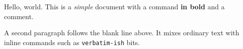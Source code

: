\documentclass{article}
\begin{document}
Hello, world. This is a \emph{simple} document with a command
\textbf{in bold} and a comment. %

A second paragraph follows the blank line above. It mixes ordinary
text with inline commands such as \texttt{verbatim-ish} bits.
\end{document}
